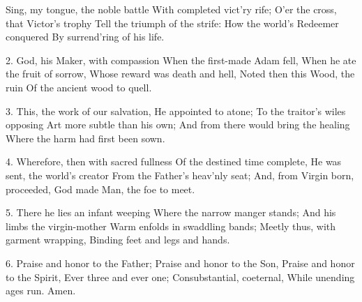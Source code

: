 Sing, my tongue, the noble battle
With completed vict'ry rife;
O'er the cross, that Victor's trophy
Tell the triumph of the strife:
How the world's Redeemer conquered
By surrend'ring of his life.

2. God, his Maker, with compassion
When the first-made Adam fell,
When he ate the fruit of sorrow,
Whose reward was death and hell,
Noted then this Wood, the ruin
Of the ancient wood to quell.

3. This, the work of our salvation,
He appointed to atone;
To the traitor's wiles opposing
Art more subtle than his own;
And from there would bring the healing
Where the harm had first been sown.

4. Wherefore, then with sacred fullness
Of the destined time complete,
He was sent, the world's creator
From the Father's heav'nly seat;
And, from Virgin born, proceeded,
God made Man, the foe to meet.

5. There he lies an infant weeping
Where the narrow manger stands;
And his limbs the virgin-mother
Warm enfolds in swaddling bands;
Meetly thus, with garment wrapping,
Binding feet and legs and hands.

6. Praise and honor to the Father;
Praise and honor to the Son,
Praise and honor to the Spirit,
Ever three and ever one;
Consubstantial, coeternal,
While unending ages run.
Amen.